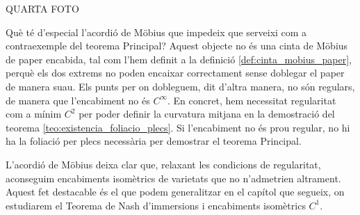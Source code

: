{\color{blue} QUARTA FOTO}

Què té d'especial l'acordió de Möbius que impedeix que serveixi com a contraexemple del teorema Principal? Aquest objecte no és una cinta de Möbius de paper encabida, tal com l'hem definit a la definició \ref{def:cinta_mobius_paper}, perquè els dos extrems no poden encaixar correctament sense doblegar el paper de manera suau. Els punts per on dobleguem, dit d'altra manera, no són regulars, de manera que l'encabiment no és $C^\infty$. En concret, hem necessitat regularitat com a mínim $C^2$ per poder definir la curvatura mitjana en la demostració del teorema \ref{teo:existencia_foliacio_plecs}. Si l'encabiment no és prou regular, no hi ha la foliació per plecs necessària per demostrar el teorema Principal. 

L'acordió de Möbius deixa clar que, relaxant les condicions de regularitat, aconseguim encabiments isomètrics de varietats que no n'admetrien altrament. Aquest fet destacable és el que podem generalitzar en el capítol que segueix, on estudiarem el Teorema de Nash d'immersions i encabiments isomètrics $C^1$.

\newpage